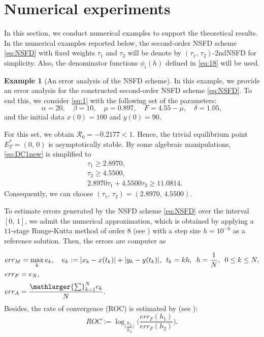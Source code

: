 \documentclass[12pt]{article}
\theoremstyle{definition}
\newtheorem{example}[theorem]{Example}
\theoremstyle{remark}
\numberwithin{equation}{section}
\begin{document}
\section{Numerical experiments}\label{Sec4}
In this section, we conduct numerical examples to support the theoretical results. In the numerical examples reported below, the second-order NSFD scheme \eqref{eq:NSFD} with fixed weights $\tau_1$ and $\tau_2$ will be denote by $(\tau_1,\,\tau_2)$-2ndNSFD for simplicity. Also, the denominator functions $\phi_i(h)$ defined in \eqref{eq:18} will be used. 
\begin{example}[An error analysis of the NSFD scheme]
In this example, we provide an error analysis for the constructed second-order NSFD scheme \eqref{eq:NSFD}. To end this, we consider \eqref{eq:1} with the following set of the parameters:
\begin{equation*}\label{eq:19}
\alpha = 20, \quad \beta = 10, \quad \mu = 0.897, \quad F = 4.55 - \mu, \quad \delta = 1.05,
\end{equation*}
and the initial data $x(0) = 100$ and $y(0) = 90$.

For this set, we obtain $\mathcal{R}_0 = -0.2177 < 1$. Hence, the trivial equilibrium point $E_T^* = (0,\,0)$ is asymptotically stable. By some algebraic manipulations, \eqref{eq:DC1new} is simplified to
\begin{equation*}
\begin{split}
&\tau_1 \geq 2.8970,\\
&\tau_2 \geq 4.5500,\\
&2.8970 \tau_1 + 4.5500 \tau_2 \geq 11.0814.
\end{split}
\end{equation*}
Consequently, we can choose $(\tau_1,\,\tau_2) = (2.8970,\,4.5500)$.

To estimate errors generated by the NSFD scheme \eqref{eq:NSFD} over the interval $[0,\,1]$, we admit the numerical approximation, which is obtained by applying a $11$-stage Runge-Kutta method of order $8$ (see \cite{Copper}) with a step size $h = 10^{-6}$ as a reference solution. Then, the errors are computer as


\begin{equation*}
\begin{split}
&err_M = \max_{k}e_k, \quad e_k := |x_k - x(t_k)| + |y_k - y(t_k)|, \,\,\, t_k = kh,\,\,\,h=\dfrac{1}{N},\,\,\,0 \leq k \leq N,\\
&err_F = e_N, \\
&err_A = \dfrac{\mathlarger{\sum}_{k = 1}^Ne_k}{N}.
\end{split}
\end{equation*}
Besides, the rate of convergence (ROC) is estimated  by (see \cite{Ascher}):
\begin{equation*}
ROC := \log_{\bigg(\dfrac{h_1}{h_2}\bigg)}\bigg(\dfrac{err_F(h_1)}{err_F(h_2)}\bigg).
\end{equation*}


\end{example}
\end{document}
